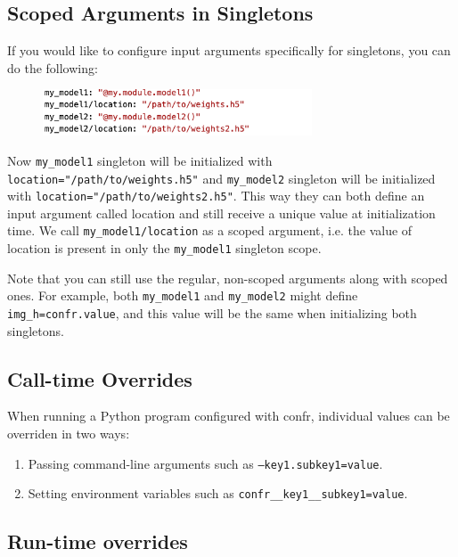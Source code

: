\documentclass{itatnew}
\begin{document}
\subsection{Scoped Arguments in Singletons}

If you would like to configure input arguments specifically for singletons, you can do the following:

\begin{figure}[H]
    \centering
    \includegraphics[width=8cm]{c8.png}
\end{figure}

Now \texttt{my_model1} singleton will be initialized with \texttt{location="/path/to/weights.h5"} and \texttt{my_model2} singleton will be initialized with \texttt{location="/path/to/weights2.h5"}. This way they can both define an input argument called location and still receive a unique value at initialization time. We call \texttt{my_model1/location} as a scoped argument, i.e. the value of location is present in only the \texttt{my_model1} singleton scope.

Note that you can still use the regular, non-scoped arguments along with scoped ones. For example, both \texttt{my_model1} and \texttt{my_model2} might define \texttt{img_h=confr.value}, and this value will be the same when initializing both singletons.

\subsection{Call-time Overrides}

When running a Python program configured with confr, individual values can be overriden in two ways:

\begin{enumerate}
    \item Passing command-line arguments such as \texttt{--key1.subkey1=value}.
    \item Setting environment variables such as \texttt{confr__key1__subkey1=value}.
\end{enumerate}

\subsection{Run-time overrides}
\end{document}

